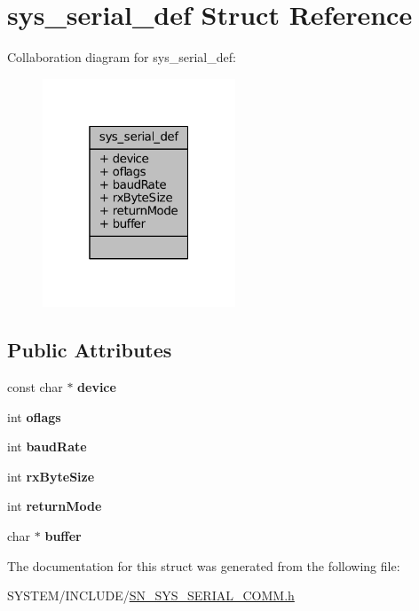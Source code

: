 \hypertarget{structsys__serial__def}{}\section{sys\+\_\+serial\+\_\+def Struct Reference}
\label{structsys__serial__def}


Collaboration diagram for sys\+\_\+serial\+\_\+def\+:\nopagebreak
\begin{figure}[H]
\begin{center}
\leavevmode
\includegraphics[width=163pt]{structsys__serial__def__coll__graph}
\end{center}
\end{figure}
\subsection*{Public Attributes}
\begin{DoxyCompactItemize}
\item 
\mbox{\label{structsys__serial__def_a5a1f5b410efe38a5def8dffd93ebdd74}} 
const char $\ast$ {\bfseries device}
\item 
\mbox{\label{structsys__serial__def_aad2328bcf4fdbf9116207b0a7c91dbdc}} 
int {\bfseries oflags}
\item 
\mbox{\label{structsys__serial__def_a8293f68f6d2c82c261e533de9171a52b}} 
int {\bfseries baud\+Rate}
\item 
\mbox{\label{structsys__serial__def_a5ead55aa773aa1a067d5736dcc51329c}} 
int {\bfseries rx\+Byte\+Size}
\item 
\mbox{\label{structsys__serial__def_a53eb17eb80e427fb9f6777820629d490}} 
int {\bfseries return\+Mode}
\item 
\mbox{\label{structsys__serial__def_afecd2c4bce45b7815986cfbaa1d270c7}} 
char $\ast$ {\bfseries buffer}
\end{DoxyCompactItemize}


The documentation for this struct was generated from the following file\+:\begin{DoxyCompactItemize}
\item 
S\+Y\+S\+T\+E\+M/\+I\+N\+C\+L\+U\+D\+E/\hyperlink{SN__SYS__SERIAL__COMM_8h}{S\+N\+\_\+\+S\+Y\+S\+\_\+\+S\+E\+R\+I\+A\+L\+\_\+\+C\+O\+M\+M.\+h}\end{DoxyCompactItemize}
